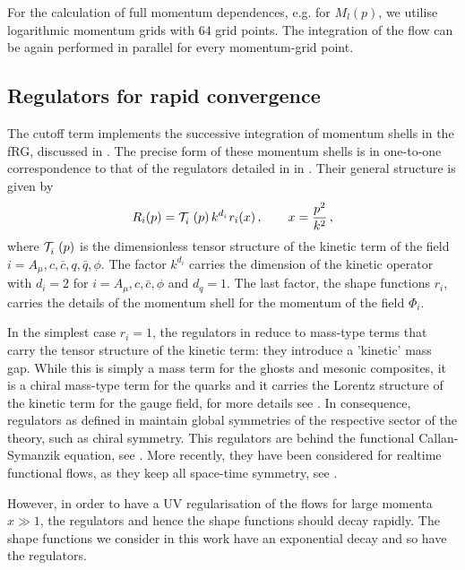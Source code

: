 \documentclass[aps,twocolumn,prd,superscriptaddress]{revtex4-2}
\begin{document}
For the calculation of full momentum dependences, e.g. for $M_l(p)$, we utilise logarithmic momentum grids with 64 grid points. The integration of the flow can be again performed in parallel for every momentum-grid point.


\subsection{Regulators for rapid convergence}
\label{sec:regulators}

The cutoff term  implements the successive integration of momentum shells in the fRG, discussed in . The precise form of these momentum shells is in one-to-one correspondence to that of the regulators detailed in  in . Their general structure is given by 
%
\begin{align} 
	R_{i}(p) = {\cal T}^{\ }_{i}(p) \, k^{d^{\ }_{i}} r_{i}(x)\,,\qquad x=\frac{p^2}{k^2}\,,  
\label{eq:RegStructure} 
\end{align}
%
where ${\cal T}^{\ }_{i}(p)$ is the dimensionless tensor structure of the kinetic term of the field $i=A_\mu, c,\bar c, q,\bar q, \phi$. The factor $k^{d_{i}}$ carries the dimension of the kinetic operator with $d_i=2$ for $i=A_\mu, c,\bar c, \phi$ and $d_q=1$. The last factor, the shape functions $r_i$, carries the details of the momentum shell for the momentum of the field $\Phi_i$. 

In the simplest case $r_i=1$, the regulators in  reduce to mass-type terms that carry the tensor structure of the kinetic term: they introduce a 'kinetic' mass gap.
While this is simply a mass term for the ghosts and mesonic composites, it is a chiral mass-type term for the quarks and it carries the Lorentz structure of the kinetic term for the gauge field, for more details see .
In consequence, regulators as defined in  maintain global symmetries of the respective sector of the theory, such as chiral symmetry. This regulators are behind the functional Callan-Symanzik equation, see \cite{Symanzik:1970rt}. More recently, they have been considered for realtime functional flows, as they keep all space-time symmetry, see \cite{Fehre:2021eob, Braun:2022mgx, Horak:2023hkp}. 

However, in order to have a UV regularisation of the flows for large momenta $x\gg 1$, the regulators and hence the shape functions should decay rapidly. The shape functions we consider in this work have an exponential decay and so have the regulators. 
\end{document}

